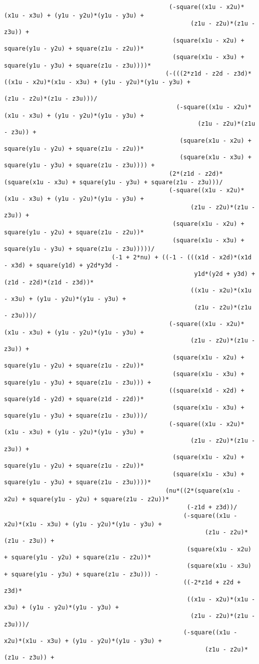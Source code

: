 \begin{lstlisting}
											  (-square((x1u - x2u)*(x1u - x3u) + (y1u - y2u)*(y1u - y3u) + 
													(z1u - z2u)*(z1u - z3u)) + 
											   (square(x1u - x2u) + square(y1u - y2u) + square(z1u - z2u))*
											   (square(x1u - x3u) + square(y1u - y3u) + square(z1u - z3u))))*
											 (-(((2*z1d - z2d - z3d)*((x1u - x2u)*(x1u - x3u) + (y1u - y2u)*(y1u - y3u) + 
																	  (z1u - z2u)*(z1u - z3u)))/
												(-square((x1u - x2u)*(x1u - x3u) + (y1u - y2u)*(y1u - y3u) + 
													  (z1u - z2u)*(z1u - z3u)) + 
												 (square(x1u - x2u) + square(y1u - y2u) + square(z1u - z2u))*
												 (square(x1u - x3u) + square(y1u - y3u) + square(z1u - z3u)))) + 
											  (2*(z1d - z2d)*(square(x1u - x3u) + square(y1u - y3u) + square(z1u - z3u)))/
											  (-square((x1u - x2u)*(x1u - x3u) + (y1u - y2u)*(y1u - y3u) + 
													(z1u - z2u)*(z1u - z3u)) + 
											   (square(x1u - x2u) + square(y1u - y2u) + square(z1u - z2u))*
											   (square(x1u - x3u) + square(y1u - y3u) + square(z1u - z3u)))))/
							  (-1 + 2*nu) + ((-1 - (((x1d - x2d)*(x1d - x3d) + square(y1d) + y2d*y3d - 
													 y1d*(y2d + y3d) + (z1d - z2d)*(z1d - z3d))*
													((x1u - x2u)*(x1u - x3u) + (y1u - y2u)*(y1u - y3u) + 
													 (z1u - z2u)*(z1u - z3u)))/
											  (-square((x1u - x2u)*(x1u - x3u) + (y1u - y2u)*(y1u - y3u) + 
													(z1u - z2u)*(z1u - z3u)) + 
											   (square(x1u - x2u) + square(y1u - y2u) + square(z1u - z2u))*
											   (square(x1u - x3u) + square(y1u - y3u) + square(z1u - z3u))) + 
											  ((square(x1d - x2d) + square(y1d - y2d) + square(z1d - z2d))*
											   (square(x1u - x3u) + square(y1u - y3u) + square(z1u - z3u)))/
											  (-square((x1u - x2u)*(x1u - x3u) + (y1u - y2u)*(y1u - y3u) + 
													(z1u - z2u)*(z1u - z3u)) + 
											   (square(x1u - x2u) + square(y1u - y2u) + square(z1u - z2u))*
											   (square(x1u - x3u) + square(y1u - y3u) + square(z1u - z3u))))*
											 (nu*((2*(square(x1u - x2u) + square(y1u - y2u) + square(z1u - z2u))*
												   (-z1d + z3d))/
												  (-square((x1u - x2u)*(x1u - x3u) + (y1u - y2u)*(y1u - y3u) + 
														(z1u - z2u)*(z1u - z3u)) + 
												   (square(x1u - x2u) + square(y1u - y2u) + square(z1u - z2u))*
												   (square(x1u - x3u) + square(y1u - y3u) + square(z1u - z3u))) - 
												  ((-2*z1d + z2d + z3d)*
												   ((x1u - x2u)*(x1u - x3u) + (y1u - y2u)*(y1u - y3u) + 
													(z1u - z2u)*(z1u - z3u)))/
												  (-square((x1u - x2u)*(x1u - x3u) + (y1u - y2u)*(y1u - y3u) + 
														(z1u - z2u)*(z1u - z3u)) + 

\end{lstlisting}
